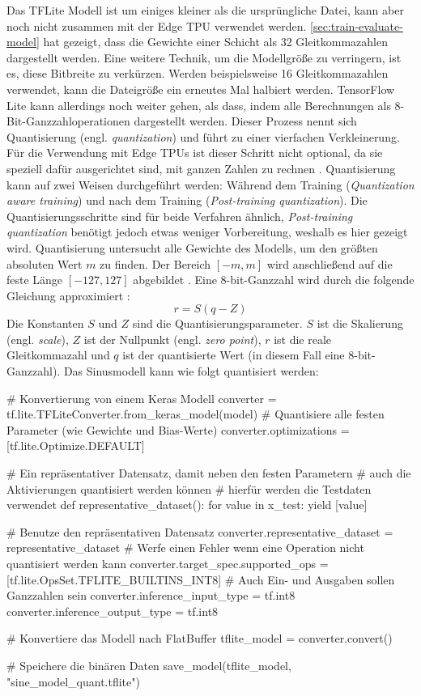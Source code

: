 Das TFLite Modell ist um einiges kleiner als die ursprüngliche Datei,
kann aber noch nicht zusammen mit der Edge TPU verwendet werden.
\autoref{sec:train-evaluate-model} hat gezeigt,
dass die Gewichte einer Schicht als
\qty{32}{\bit} Gleitkommazahlen dargestellt werden.
Eine weitere Technik, um die Modellgröße zu verringern,
ist es, diese Bitbreite zu verkürzen.
Werden beispielsweise \qty{16}{\bit} Gleitkommazahlen verwendet,
kann die Dateigröße ein erneutes Mal halbiert werden.
TensorFlow Lite kann allerdings noch weiter gehen, als dass, indem
alle Berechnungen als 8-Bit-Ganzzahloperationen dargestellt werden.
Dieser Prozess nennt sich Quantisierung
(engl. \textit{quantization}) und führt zu einer vierfachen Verkleinerung.
Für die Verwendung mit Edge TPUs ist dieser Schritt nicht optional,
da sie speziell dafür ausgerichtet sind,
mit ganzen Zahlen zu rechnen \parencite{online:models-on-edge-tpu}.
Quantisierung kann auf zwei Weisen durchgeführt werden:
Während dem Training (\textit{Quantization aware training})
und nach dem Training (\textit{Post-training quantization}).
Die Quantisierungsschritte sind für beide Verfahren ähnlich,
\textit{Post-training quantization} benötigt jedoch etwas weniger Vorbereitung,
weshalb es hier gezeigt wird.
Quantisierung untersucht alle Gewichte des Modells, um
den größten absoluten Wert $m$ zu finden. Der Bereich $[-m,m]$
wird anschließend auf die feste Länge $[-127,127]$
abgebildet \parencite[686]{book:hands-on-ml}.
Eine 8-bit-Ganzzahl wird durch die folgende Gleichung ap­pro­xi­mie­rt \parencite{DBLP:quantization}:
\begin{equation}
  r = S(q - Z)
  \label{eq:quant}
\end{equation}
Die Konstanten $S$ und $Z$ sind die Quantisierungsparameter.
$S$ ist die Skalierung (engl. \textit{scale}),
$Z$ ist der Nullpunkt (engl. \textit{zero point}),
$r$ ist die reale Gleitkommazahl und $q$ ist der quantisierte Wert
(in diesem Fall eine 8-bit-Ganzzahl).
Das Sinusmodell kann wie folgt quantisiert werden:
\begin{pythoncode}
# Konvertierung von einem Keras Modell
converter = tf.lite.TFLiteConverter.from_keras_model(model)
# Quantisiere alle festen Parameter (wie Gewichte und Bias-Werte)
converter.optimizations = [tf.lite.Optimize.DEFAULT]

# Ein repräsentativer Datensatz, damit neben den festen Parametern
# auch die Aktivierungen quantisiert werden können
# hierfür werden die Testdaten verwendet
def representative_dataset():
    for value in x_test:
        yield [value]

# Benutze den repräsentativen Datensatz
converter.representative_dataset = representative_dataset
# Werfe einen Fehler wenn eine Operation nicht quantisiert werden kann
converter.target_spec.supported_ops = [tf.lite.OpsSet.TFLITE_BUILTINS_INT8]
# Auch Ein- und Ausgaben sollen Ganzzahlen sein
converter.inference_input_type = tf.int8
converter.inference_output_type = tf.int8

# Konvertiere das Modell nach FlatBuffer
tflite_model = converter.convert()

# Speichere die binären Daten
save_model(tflite_model, "sine_model_quant.tflite")
\end{pythoncode}
